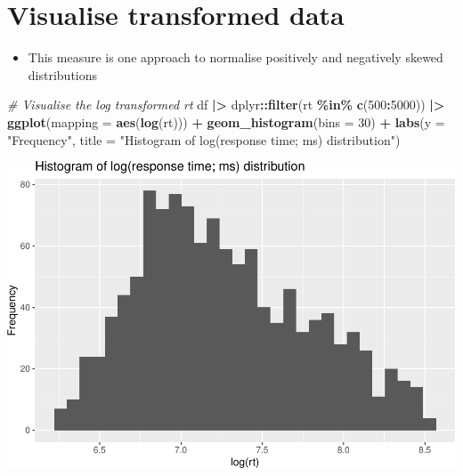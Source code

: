 \documentclass[
]{article}
\newenvironment{Shaded}{\begin{snugshade}}{\end{snugshade}}
\newcommand{\AttributeTok}[1]{\textcolor[rgb]{0.13,0.29,0.53}{#1}}
\newcommand{\CommentTok}[1]{\textcolor[rgb]{0.56,0.35,0.01}{\textit{#1}}}
\newcommand{\DecValTok}[1]{\textcolor[rgb]{0.00,0.00,0.81}{#1}}
\newcommand{\FunctionTok}[1]{\textcolor[rgb]{0.13,0.29,0.53}{\textbf{#1}}}
\newcommand{\NormalTok}[1]{#1}
\newcommand{\SpecialCharTok}[1]{\textcolor[rgb]{0.81,0.36,0.00}{\textbf{#1}}}
\newcommand{\StringTok}[1]{\textcolor[rgb]{0.31,0.60,0.02}{#1}}
\providecommand{\tightlist}{%
  \setlength{\itemsep}{0pt}\setlength{\parskip}{0pt}}
\begin{document}
\hypertarget{visualise-transformed-data}{%
\section{Visualise transformed data}\label{visualise-transformed-data}}

\begin{itemize}
\tightlist
\item
  This measure is one approach to normalise positively and negatively
  skewed distributions
\end{itemize}

\begin{Shaded}
\begin{Highlighting}[]
\CommentTok{\# Visualise the log transformed rt}
\NormalTok{df }\SpecialCharTok{|\textgreater{}}
\NormalTok{  dplyr}\SpecialCharTok{::}\FunctionTok{filter}\NormalTok{(rt }\SpecialCharTok{\%in\%} \FunctionTok{c}\NormalTok{(}\DecValTok{500}\SpecialCharTok{:}\DecValTok{5000}\NormalTok{)) }\SpecialCharTok{|\textgreater{}}
  \FunctionTok{ggplot}\NormalTok{(}\AttributeTok{mapping =} \FunctionTok{aes}\NormalTok{(}\FunctionTok{log}\NormalTok{(rt))) }\SpecialCharTok{+}
  \FunctionTok{geom\_histogram}\NormalTok{(}\AttributeTok{bins =} \DecValTok{30}\NormalTok{) }\SpecialCharTok{+} 
  \FunctionTok{labs}\NormalTok{(}\AttributeTok{y =} \StringTok{"Frequency"}\NormalTok{,}
       \AttributeTok{title =} \StringTok{"Histogram of log(response time; ms) distribution"}\NormalTok{)}
\end{Highlighting}
\end{Shaded}

\includegraphics{T5_Data_wrangling_pdf_files/figure-latex/unnamed-chunk-12-1.pdf}
\end{document}
